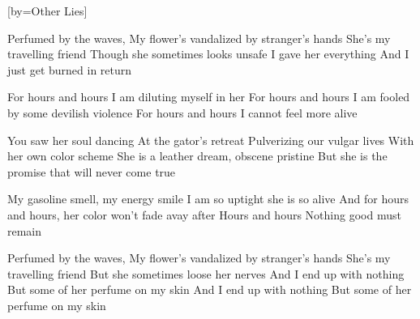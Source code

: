 [by={Other Lies}]


  \chordsoff
  \beginverse
  Perfumed by the waves,
  My flower's vandalized by stranger's hands
  She's my travelling friend
  Though she sometimes looks unsafe
  I gave her everything
  And I just get burned in return
  \endverse
  
  \beginchorus
  For hours and hours I am diluting myself in her
  For hours and hours I am fooled by some devilish violence
  For hours and hours I cannot feel more alive
  \endchorus
  
  \beginverse
  You saw her soul dancing
  At the gator's retreat
  Pulverizing our vulgar lives
  With her own color scheme
  She is a leather dream, obscene pristine
  But she is the promise that will never come true
  \endverse
  
  \beginchorus
  My gasoline smell, my energy smile
  I am so uptight she is so alive
  And for hours and hours, her color won't fade avay after
  Hours and hours
  Nothing good must remain
  \endchorus

  \beginverse
  Perfumed by the waves,
  My flower's vandalized by stranger's hands
  She's my travelling friend
  But she sometimes loose her nerves
  And I end up with nothing
  But some of her perfume on my skin
  And I end up with nothing
  But some of her perfume on my skin
  \endverse
\endsong
